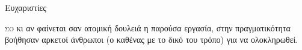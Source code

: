 \begin{center}
{\LARGE Ευχαριστίες}\\[1cm]
\end{center}

\lettrine[findent=2pt]{}{σο} κι αν φαίνεται σαν ατομική δουλειά η παρούσα εργασία, στην πραγματικότητα βοήθησαν αρκετοί άνθρωποι (ο καθένας με το δικό του τρόπο) για να ολοκληρωθεί. 